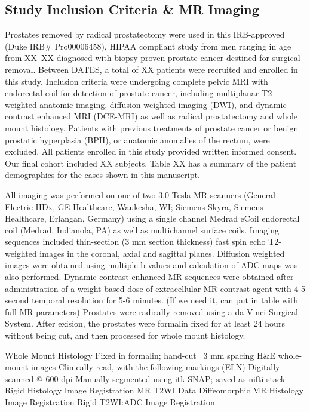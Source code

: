 \subsection{Study Inclusion Criteria \& MR Imaging}
Prostates removed by radical prostatectomy were used in this IRB-approved (Duke
IRB\# Pro00006458), HIPAA compliant study from men ranging in age from XX--XX
diagnosed with biopsy-proven prostate cancer destined for surgical removal.
Between DATES, a total of XX patients were recruited and enrolled in this
study. Inclusion criteria were undergoing complete pelvic MRI with endorectal
coil for detection of prostate cancer, including multiplanar T2-weighted
anatomic imaging, diffusion-weighted imaging (DWI), and dynamic contrast
enhanced MRI (DCE-MRI) as well as radical prostatectomy and whole mount
histology. Patients with previous treatments of prostate cancer or benign
prostatic hyperplasia (BPH), or anatomic anomalies of the rectum, were
excluded.  All patients enrolled in this study provided written informed
consent. Our final cohort included XX subjects. Table XX has a summary of the
patient demographics for the cases shown in this manuscript.  

All imaging was performed on one of two 3.0 Tesla MR scanners (General Electric
HDx, GE Healthcare, Waukesha, WI;  Siemens Skyra, Siemens Healthcare, Erlangan,
Germany) using a single channel Medrad eCoil endorectal coil (Medrad,
Indianola, PA) as well as multichannel surface coils.  Imaging sequences
included thin-section (3 mm section thickness) fast spin echo T2-weighted
images in the coronal, axial and sagittal planes.  Diffusion weighted images
were obtained using multiple b-values and calculation of ADC maps was also
performed.  Dynamic contrast enhanced MR sequences were obtained after
administration of a weight-based dose of extracellular MR contrast agent with
4-5 second temporal resolution for 5-6 minutes. (If we need it, can put in
table with full MR parameters) Prostates were radically removed using a da
Vinci Surgical System.  After exision, the prostates were formalin fixed for at
least 24 hours without being cut, and then processed for whole mount histology.

Whole Mount Histology
Fixed in formalin; hand-cut ~3 mm spacing
H\&E whole-mount images
Clinically read, with the following markings (ELN)
Digitally-scanned @ 600 dpi
Manually segmented using itk-SNAP; saved as nifti stack
Rigid Histology Image Registration
MR T2WI Data
Diffeomorphic MR:Histology Image Registration
Rigid T2WI:ADC Image Registration
